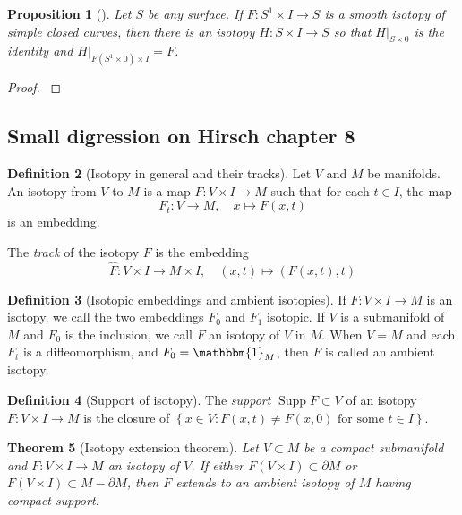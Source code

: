 \documentclass[reqno]{amsart}
\newtheorem{theorem}{Theorem}[section]
\newtheorem{proposition}[theorem]{Proposition}
\theoremstyle{definition}
\newtheorem{definition}[theorem]{Definition}
\theoremstyle{remark}
\DeclareMathOperator{\Supp}{Supp}
\begin{document}
\begin{proposition}[]
    Let $S$ be any surface. If $F \colon S^{1} \times I \to 
    S$ is a smooth isotopy of simple closed curves, then
    there is an isotopy $H \colon S \times I \to S$ so that
    $H |_{S \times 0}$ is the identity and 
    $H|_{F\left( S^{1} \times 0 \right) \times I} = F$.
\end{proposition}

\begin{proof}
    \cite[Ch~8, Thm 1.3]{Hirsch}
\end{proof}

\subsection{Small digression on Hirsch chapter 8}

\begin{definition}[Isotopy in general and their tracks]
    Let $V$ and $M$ be manifolds. An
    isotopy from $V$ to $M$ is a map
    $F \colon V \times I \to M$ such that
    for each $t \in I$, the map
    \[
    F_t \colon V \to M, \quad x \mapsto F(x,t)
    \] 
    is an embedding.

    The \textit{track} of the isotopy $F$ is the embedding
    \[
    \hat{F} \colon V \times I \to M \times I, \quad
    \left( x,t \right) \mapsto \left( F(x,t),t \right) 
    \] 
\end{definition}

\begin{definition}[Isotopic embeddings and ambient isotopies]
    If $F \colon V \times I \to M$ is an isotopy, we call
    the two embeddings $F_0$ and $F_1$ 
    isotopic. If $V$ is a submanifold of $M$ and
    $F_0$ is the inclusion, we call $F$ an isotopy
    of $V$ in $M$.
    When $V = M$ and each $F_t$ is a diffeomorphism, and
    $F_0 = \mathbbm{1}_M$, then $F$ is called
    an ambient isotopy.
\end{definition}

\begin{definition}[Support of isotopy]
    The \textit{support} $\Supp F
    \subset V $ of an isotopy $F \colon V \times I \to M$ 
    is the closure of
    $\left\{ x \in V \colon
    F(x,t) \neq F(x,0) \text{ for some }
t \in I\right\} $.
\end{definition}


\begin{theorem}[Isotopy extension theorem]\label{isotopy-extension}
    \cite[Theorem 1.3, chapter 8]{Hirsch}
    Let $V \subset M$ be a compact submanifold
    and $F \colon V \times I \to M$ an isotopy
    of $V$. If either $F\left( V \times I \right) 
    \subset \partial M$ or $F\left( V \times I \right) 
    \subset M - \partial M$, then $F$ extends to
    an ambient isotopy of $M$ having compact support.
\end{theorem}
\end{document}
